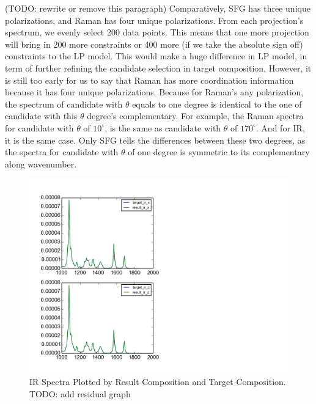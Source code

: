 (TODO: rewrite or remove this paragraph) Comparatively, SFG has three unique polarizations, and Raman has four unique polarizations. From each projection's spectrum, we evenly select 200 data points. This means that one more projection will bring in 200 more constraints or 400 more (if we take the absolute sign off) constraints to the LP model. This would make a huge difference in LP model, in term of further refining the candidate selection in target composition. However, it is still too early for us to say that Raman has more coordination information because it has four unique polarizations. Because for Raman's any polarization, the spectrum of candidate with $\theta$ equals to one degree is identical to the one of candidate with this $\theta$ degree's complementary. For example, the Raman spectra for candidate with $\theta$ of $10^{\circ}$, is the same as candidate with $\theta$ of $170^{\circ}$. And for IR, it is the same case. Only SFG tells the differences between these two degrees, as the spectra for candidate with $\theta$ of one degree is symmetric to its complementary along wavenumber. \\

\begin{figure}[!ht] 
\centering
\includegraphics[scale=0.7]{Figures/result_target_plotting_ir16.png}
\caption{IR Spectra Plotted by Result Composition and Target Composition. TODO: add residual graph} \label{fig:5.2}
\end{figure}


